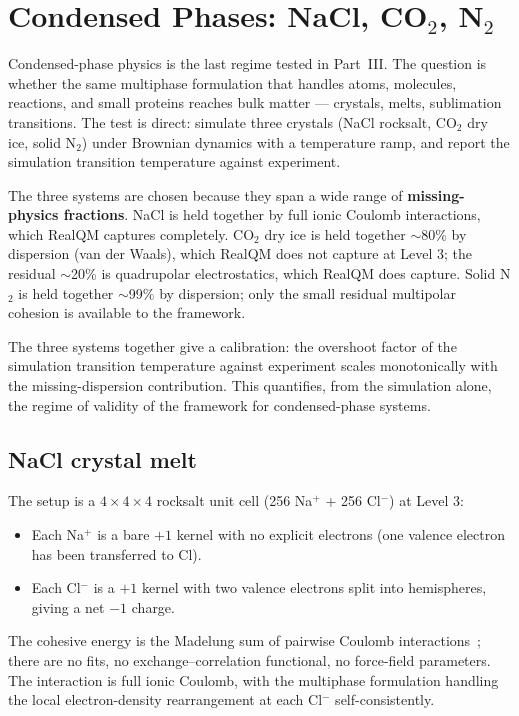\chapter{Condensed Phases: NaCl, CO$_2$, N$_2$}\label{ch:condensed}

Condensed-phase physics is the last regime tested in Part~III. The question is whether the same multiphase formulation that handles atoms, molecules, reactions, and small proteins reaches bulk matter --- crystals, melts, sublimation transitions. The test is direct: simulate three crystals (NaCl rocksalt, CO$_2$ dry ice, solid N$_2$) under Brownian dynamics with a temperature ramp, and report the simulation transition temperature against experiment.

The three systems are chosen because they span a wide range of \textbf{missing-physics fractions}. NaCl is held together by full ionic Coulomb interactions, which RealQM captures completely. CO$_2$ dry ice is held together $\sim$80\% by dispersion (van der Waals), which RealQM does not capture at Level 3; the residual $\sim$20\% is quadrupolar electrostatics, which RealQM does capture. Solid N$_2$ is held together $\sim$99\% by dispersion; only the small residual multipolar cohesion is available to the framework.

The three systems together give a calibration: the overshoot factor of the simulation transition temperature against experiment scales monotonically with the missing-dispersion contribution. This quantifies, from the simulation alone, the regime of validity of the framework for condensed-phase systems.

\section{NaCl crystal melt}\label{sec:nacl}

The setup is a $4 \times 4 \times 4$ rocksalt unit cell (256 Na$^+$ + 256 Cl$^-$) at Level 3:
\begin{itemize}
\item Each Na$^+$ is a bare $+1$ kernel with no explicit electrons (one valence electron has been transferred to Cl).
\item Each Cl$^-$ is a $+1$ kernel with two valence electrons split into hemispheres, giving a net $-1$ charge.
\end{itemize}
The cohesive energy is the Madelung sum of pairwise Coulomb interactions~\cite{BornMayer32}; there are no fits, no exchange--correlation functional, no force-field parameters. The interaction is full ionic Coulomb, with the multiphase formulation handling the local electron-density rearrangement at each Cl$^-$ self-consistently.

